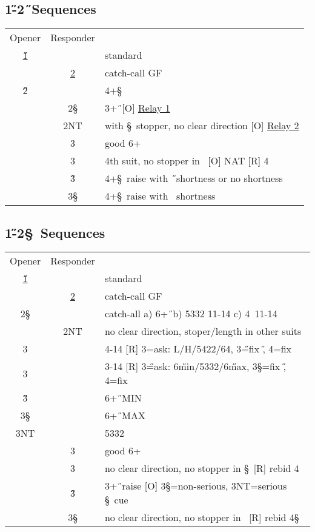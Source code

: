 \subsection{1\H-2\H\ Sequences}

\hypertarget{1h2c2h}{}
\begin{longtable}{C{\bidlength} C{\bidlength} | l}
Opener & Responder \\
\hyperlink{1h}{1\H} & & standard \\
& \hyperlink{1h2c}{2\C} & catch-call GF \\
2\H & & 4+\S \\
\hline\hline
& 2\S & 3+\H\ [O] \hyperlink{1h2c2dR1}{Relay 1}\\
& 2NT & with \S\ stopper, no clear direction [O] \hyperlink{1h2c2dR2}{Relay 2}\\
& 3\C & good 6+\C \\
& 3\D & 4th suit, no stopper in \D\ [O] NAT [R] 4\D \\
& 3\H & 4+\S\ raise with \H\ shortness or no shortness \\
& 3\S & 4+\S\ raise with \D\ shortness \\
\end{longtable}

\subsection{1\H-2\S\ Sequences}

\hypertarget{1h2c2s}{}
\begin{longtable}{C{\bidlength} C{\bidlength} | l}
Opener & Responder \\
\hyperlink{1h}{1\H} & & standard \\
& \hyperlink{1h2c}{2\C} & catch-call GF \\
2\S & & catch-all a) 6+\H\ b) 5332 11-14 c) 4\C\ 11-14 \\
\hline\hline
& 2NT & no clear direction, stoper/length in other suits \\
3\C & & 4-14 [R] 3\D=ask: L/H/5422/64, 3\H=fix \H, 4\C=fix \C \\
3\D & & 3-14 [R] 3\H=ask: 6\H min/5332/6\H max, 3\S=fix \H, 4\C=fix \C \\
3\H & & 6+\H\ MIN \\
3\S & & 6+\H\ MAX \\
3NT & & 5332\C \\
& 3\C & good 6+\C \\
& 3\D & no clear direction, no stopper in \S\ [R] rebid 4\D \\
& 3\H & 3+\H\ raise [O] 3\S=non-serious, 3NT=serious \S\ cue \\
& 3\S & no clear direction, no stopper in \D\ [R] rebid 4\S \\
\end{longtable}

